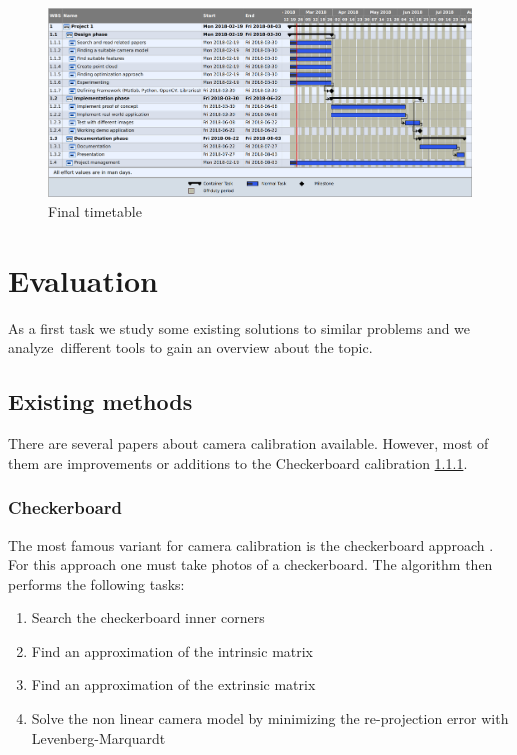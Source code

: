 \documentclass[11pt,a4paper,titlepage,oneside]{report}
\begin{document}
\begin{figure}[H]
	\includegraphics[width=1.0\textwidth]{img/timetable_is.png}
	\caption{Final timetable}\label{fig:timetable_is}
\end{figure}



\chapter{Evaluation}

As a first task we study some existing solutions to similar problems and we analyze different tools to gain an overview about the topic.

\section{Existing methods}

There are several papers about camera calibration available. However, most of them are improvements or additions to the Checkerboard calibration \ref{sec:checkerboard}.

\subsection{Checkerboard}\label{sec:checkerboard}
The most famous variant for camera calibration is the checkerboard approach \cite{Zhang}. For this approach one must take photos of a checkerboard. The algorithm then performs the following tasks:
\begin{enumerate}
  \item Search the checkerboard inner corners
  \item Find an approximation of the intrinsic matrix
  \item Find an approximation of the extrinsic matrix
  \item Solve the non linear camera model by minimizing the re-projection error with Levenberg-Marquardt
\end{enumerate}
\end{document}
